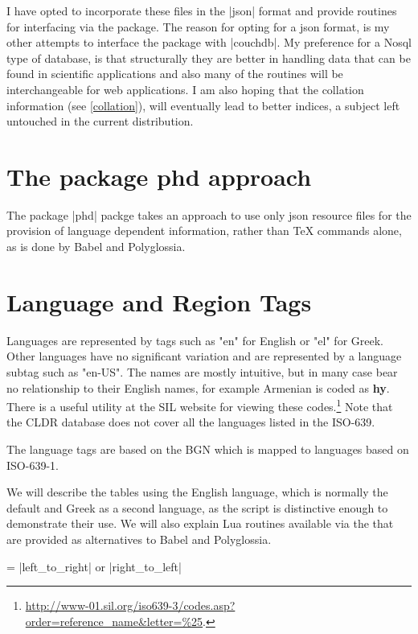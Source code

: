 I have opted to incorporate these files in the |json| format and provide routines for interfacing via the  package.  The reason for opting for a json format, is my other attempts to interface the package with |couchdb|.  My preference for a Nosql type of database, is that structurally they are better in handling data that can be found in scientific applications and also many of the routines will be interchangeable for web applications. I am also hoping that the collation information (see \ref{collation}), will eventually lead to better indices, a subject left untouched in the current distribution.

\section{The package phd approach}

The package |phd| packge takes an approach to use only json resource files for the provision of language dependent information, rather than TeX commands alone, as is done by Babel and Polyglossia. 

\section{Language and Region Tags}

Languages are represented by tags such as "en"  for English or "el" for Greek. Other languages have no significant variation and are represented by a language subtag such as "en-US".  The names are mostly intuitive, but in many case bear no relationship to their English names, for example Armenian is coded as \textbf{hy}. There is a useful utility at the SIL website for viewing these codes.\footnote{\protect\url{http://www-01.sil.org/iso639-3/codes.asp?order=reference_name&letter=\%25}.} Note that the CLDR database does not cover all the languages listed in the ISO-639.

The language tags are based on the BGN which is mapped to languages based on ISO-639-1. 

We will describe the tables using the English language, which is normally the default and Greek as a second language, as the script is distinctive enough to demonstrate their use. We will also explain Lua routines available via the  that are provided as alternatives to Babel and Polyglossia.



 = |left_to_right| or |right_to_left|

